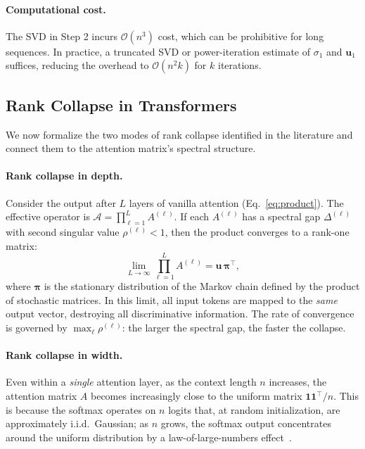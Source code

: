\documentclass[12pt, a4paper]{article}
\begin{document}
\paragraph{Computational cost.}
The SVD in Step 2 incurs $\mathcal{O}(n^3)$ cost, which can be
prohibitive for long sequences. In practice, a truncated SVD or
power-iteration estimate of $\sigma_1$ and $\mathbf{u}_1$ suffices,
reducing the overhead to $\mathcal{O}(n^2 k)$ for $k$ iterations.

\subsection{Rank Collapse in Transformers}

We now formalize the two modes of rank collapse identified in the
literature and connect them to the attention matrix's spectral structure.

\paragraph{Rank collapse in depth.}
Consider the output after $L$ layers of vanilla attention
(Eq.~\ref{eq:product}). The effective operator is
$\mathcal{A} = \prod_{\ell=1}^{L} A^{(\ell)}$. If each $A^{(\ell)}$
has a spectral gap $\Delta^{(\ell)}$ with second singular value
$\rho^{(\ell)} < 1$, then the product converges to a rank-one matrix:
\begin{equation}
    \lim_{L \to \infty} \prod_{\ell=1}^{L} A^{(\ell)}
    = \mathbf{u}\, \boldsymbol{\pi}^\top,
    \label{eq:rank_one_limit}
\end{equation}
where $\boldsymbol{\pi}$ is the stationary distribution of the
Markov chain defined by the product of stochastic matrices. In this
limit, all input tokens are mapped to the \textit{same} output vector,
destroying all discriminative information. The rate of convergence is
governed by $\max_\ell \rho^{(\ell)}$: the larger the spectral gap,
the faster the collapse.

\paragraph{Rank collapse in width.}
Even within a \textit{single} attention layer, as the context length
$n$ increases, the attention matrix $A$ becomes increasingly close to
the uniform matrix $\mathbf{1}\mathbf{1}^\top / n$. This is because the
softmax operates on $n$ logits that, at random initialization, are
approximately i.i.d.\ Gaussian; as $n$ grows, the softmax output
concentrates around the uniform distribution by a law-of-large-numbers
effect~\cite{mind_the_gap}.
\end{document}
